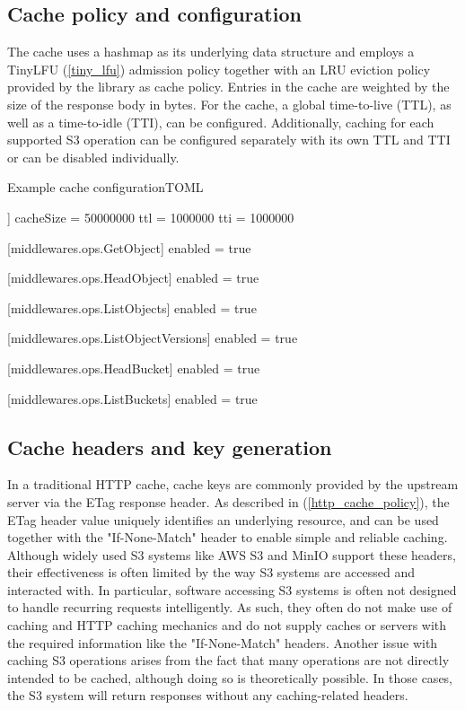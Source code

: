 \subsection{Cache policy and configuration}

The cache uses a hashmap as its underlying data structure and employs a TinyLFU (\ref{tiny_lfu}) admission policy together with an LRU eviction policy provided by the \cite{MOKA_GITHUB} library as cache policy. Entries in the cache are weighted by the size of the response body in bytes. For the cache, a global time-to-live (TTL), as well as a time-to-idle (TTI), can be configured. Additionally, caching for each supported S3 operation can be configured separately with its own TTL and TTI or can be disabled individually.

\begin{codeblock}{Example cache configuration}{TOML}
	\begin{javacode}
		[[middlewares]]
		cacheSize = 50000000
		ttl = 1000000
		tti = 1000000
		
		[middlewares.ops.GetObject]
		enabled = true
		
		[middlewares.ops.HeadObject]
		enabled = true
		
		[middlewares.ops.ListObjects]
		enabled = true
		
		[middlewares.ops.ListObjectVersions]
		enabled = true
		
		[middlewares.ops.HeadBucket]
		enabled = true
		
		[middlewares.ops.ListBuckets]
		enabled = true
	\end{javacode}
\end{codeblock}

\subsection{Cache headers and key generation}
\label{impl:httpheaders}
In a traditional HTTP cache, cache keys are commonly provided by the upstream server via the ETag response header. As described in (\ref{http_cache_policy}), the ETag header value uniquely identifies an underlying resource, and can be used together with the "If-None-Match" header to enable simple and reliable caching. Although widely used S3 systems like AWS S3 and MinIO support these headers, their effectiveness is often limited by the way S3 systems are accessed and interacted with.
In particular, software accessing S3 systems is often not designed to handle recurring requests intelligently. As such, they often do not make use of caching and HTTP caching mechanics and do not supply caches or servers with the required information like the "If-None-Match" headers. Another issue with caching S3 operations arises from the fact that many operations are not directly intended to be cached, although doing so is theoretically possible. In those cases, the S3 system will return responses without any caching-related headers.

